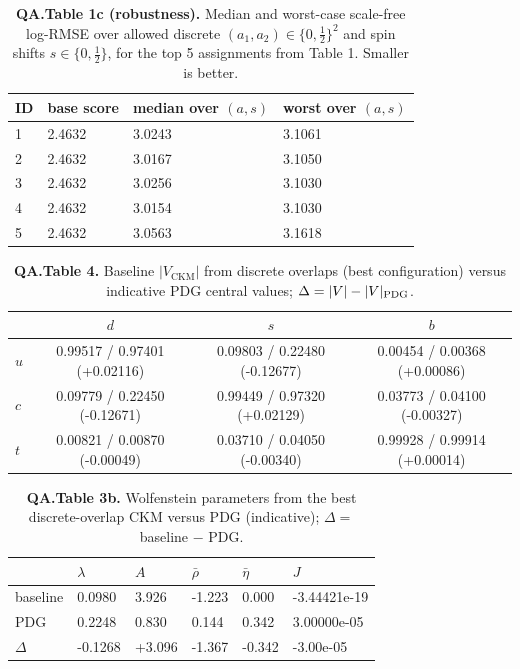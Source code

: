 \begin{table}[h]
\centering
\small
\caption{\textbf{QA.Table 1c (robustness).} Median and worst-case scale-free log-RMSE over allowed discrete $(a_1,a_2)\in\{0,\tfrac12\}^2$ and spin shifts $s\in\{0,\tfrac12\}$, for the top 5 assignments from Table 1. Smaller is better.}
\begin{tabular}{llll}
\hline
ID & base score & median over $(a,s)$ & worst over $(a,s)$ \\
\hline
1 & 2.4632 & 3.0243 & 3.1061\\
2 & 2.4632 & 3.0167 & 3.1050\\
3 & 2.4632 & 3.0256 & 3.1030\\
4 & 2.4632 & 3.0154 & 3.1030\\
5 & 2.4632 & 3.0563 & 3.1618\\
\hline
\end{tabular}
\end{table}

\begin{table}[h]
\centering
\small
\caption{\textbf{QA.Table 4.} Baseline $|V_{\mathrm{CKM}}|$ from discrete overlaps (best configuration) versus indicative PDG central values; $\Delta=|V|-|V|_{\rm PDG}$.}
\begin{tabular}{lccc}
\hline
 & $d$ & $s$ & $b$ \\
\hline
$u$ & 0.99517 / 0.97401 (+0.02116) & 0.09803 / 0.22480 (-0.12677) & 0.00454 / 0.00368 (+0.00086)\\
$c$ & 0.09779 / 0.22450 (-0.12671) & 0.99449 / 0.97320 (+0.02129) & 0.03773 / 0.04100 (-0.00327)\\
$t$ & 0.00821 / 0.00870 (-0.00049) & 0.03710 / 0.04050 (-0.00340) & 0.99928 / 0.99914 (+0.00014)\\
\hline
\end{tabular}
\end{table}

\begin{table}[h]
\centering
\small
\caption{\textbf{QA.Table 3b.} Wolfenstein parameters from the best discrete-overlap CKM versus PDG (indicative); $\Delta =$ baseline $-$ PDG.}
\begin{tabular}{llllll}
\hline
 & $\lambda$ & $A$ & $\bar\rho$ & $\bar\eta$ & $J$ \\
\hline
baseline & 0.0980 & 3.926 & -1.223 & 0.000 & -3.44421e-19\\
PDG & 0.2248 & 0.830 & 0.144 & 0.342 & 3.00000e-05\\
$\Delta$ & -0.1268 & +3.096 & -1.367 & -0.342 & -3.00e-05\\
\hline
\end{tabular}
\end{table}

